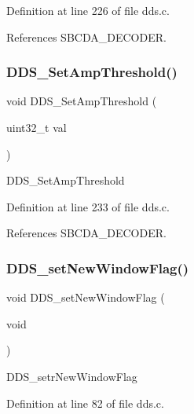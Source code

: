 Definition at line 226 of file dds.\+c.



References S\+B\+C\+D\+A\+\_\+\+D\+E\+C\+O\+D\+ER.

\mbox{\label{group___d_d_s_gaaeb0c0549ccf4a0d5c4eb4b8733aad15}} 
\subsubsection{\texorpdfstring{D\+D\+S\+\_\+\+Set\+Amp\+Threshold()}{DDS\_SetAmpThreshold()}}
{\footnotesize\ttfamily void D\+D\+S\+\_\+\+Set\+Amp\+Threshold (\begin{DoxyParamCaption}\item[{uint32\+\_\+t}]{val }\end{DoxyParamCaption})}

D\+D\+S\+\_\+\+Set\+Amp\+Threshold 

Definition at line 233 of file dds.\+c.



References S\+B\+C\+D\+A\+\_\+\+D\+E\+C\+O\+D\+ER.

\mbox{\label{group___d_d_s_ga010269c11a1f1c9f53f31d1521a22471}} 
\subsubsection{\texorpdfstring{D\+D\+S\+\_\+set\+New\+Window\+Flag()}{DDS\_setNewWindowFlag()}}
{\footnotesize\ttfamily void D\+D\+S\+\_\+set\+New\+Window\+Flag (\begin{DoxyParamCaption}\item[{void}]{ }\end{DoxyParamCaption})}

D\+D\+S\+\_\+setr\+New\+Window\+Flag 

Definition at line 82 of file dds.\+c.

\mbox{\label{group___d_d_s_ga396bdfd69860d5c88d26f7094a3cc41c}} 
